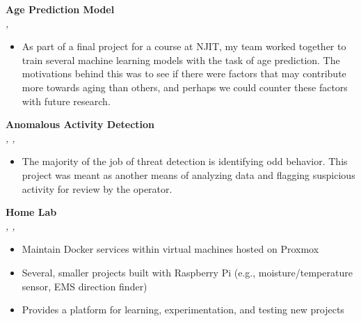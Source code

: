 \documentclass[a4paper]{article}
\begin{document}
            {\textbf{Age Prediction Model}}\\
            \textit{, }
            \vspace{-1mm}
            \begin{itemize} \itemsep 1pt
            
                    \item As part of a final project for a course at NJIT, my team worked together to train several machine learning models with the task of age prediction. The motivations behind this was to see if there were factors that may contribute more towards aging than others, and perhaps we could counter these factors with future research.
                
            \end{itemize}
            \vspace*{2mm}
            
            {\textbf{Anomalous Activity Detection}}\\
            \textit{, , }
            \vspace{-1mm}
            \begin{itemize} \itemsep 1pt
            
                    \item The majority of the job of threat detection is identifying odd behavior. This project was meant as another means of analyzing data and flagging suspicious activity for review by the operator.
                
            \end{itemize}
            \vspace*{2mm}
            
            {\textbf{Home Lab}}\\
            \textit{, , }
            \vspace{-1mm}
            \begin{itemize} \itemsep 1pt
            
                    \item Maintain Docker services within virtual machines hosted on Proxmox
                
                    \item Several, smaller projects built with Raspberry Pi (e.g., moisture/temperature sensor, EMS direction finder)
                
                    \item Provides a platform for learning, experimentation, and testing new projects
                
            \end{itemize}
            \vspace*{2mm}
            
\end{document}

